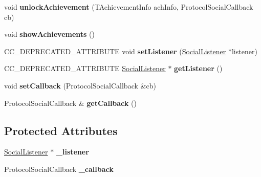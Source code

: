 \begin{DoxyCompactItemize}
void {\bfseries unlock\+Achievement} (T\+Achievement\+Info ach\+Info, Protocol\+Social\+Callback cb)
\item 
\mbox{\label{classcocos2d_1_1plugin_1_1ProtocolSocial_adc2d7f021f2718601f21e2c426481214}} 
void {\bfseries show\+Achievements} ()
\item 
\mbox{\label{classcocos2d_1_1plugin_1_1ProtocolSocial_aad02ba7876da6509666ff796f5e38eb5}} 
C\+C\+\_\+\+D\+E\+P\+R\+E\+C\+A\+T\+E\+D\+\_\+\+A\+T\+T\+R\+I\+B\+U\+TE void {\bfseries set\+Listener} (\hyperlink{classcocos2d_1_1plugin_1_1SocialListener}{Social\+Listener} $\ast$listener)
\item 
\mbox{\label{classcocos2d_1_1plugin_1_1ProtocolSocial_a345abe930733a04650dcfc8ef9d39a52}} 
C\+C\+\_\+\+D\+E\+P\+R\+E\+C\+A\+T\+E\+D\+\_\+\+A\+T\+T\+R\+I\+B\+U\+TE \hyperlink{classcocos2d_1_1plugin_1_1SocialListener}{Social\+Listener} $\ast$ {\bfseries get\+Listener} ()
\item 
\mbox{\label{classcocos2d_1_1plugin_1_1ProtocolSocial_a76218788cc42865eb4efe21b32914c5d}} 
void {\bfseries set\+Callback} (Protocol\+Social\+Callback \&cb)
\item 
\mbox{\label{classcocos2d_1_1plugin_1_1ProtocolSocial_af0b8db1f98b5f67b6166aab9459272dc}} 
Protocol\+Social\+Callback \& {\bfseries get\+Callback} ()
\end{DoxyCompactItemize}
\subsection*{Protected Attributes}
\begin{DoxyCompactItemize}
\item 
\mbox{\label{classcocos2d_1_1plugin_1_1ProtocolSocial_a59a262ac149a0e183e4a7c9c23ff8b06}} 
\hyperlink{classcocos2d_1_1plugin_1_1SocialListener}{Social\+Listener} $\ast$ {\bfseries \+\_\+listener}
\item 
\mbox{\label{classcocos2d_1_1plugin_1_1ProtocolSocial_abbd666c677dfd3ba51b52c491f519a5e}} 
Protocol\+Social\+Callback {\bfseries \+\_\+callback}
\end{DoxyCompactItemize}


